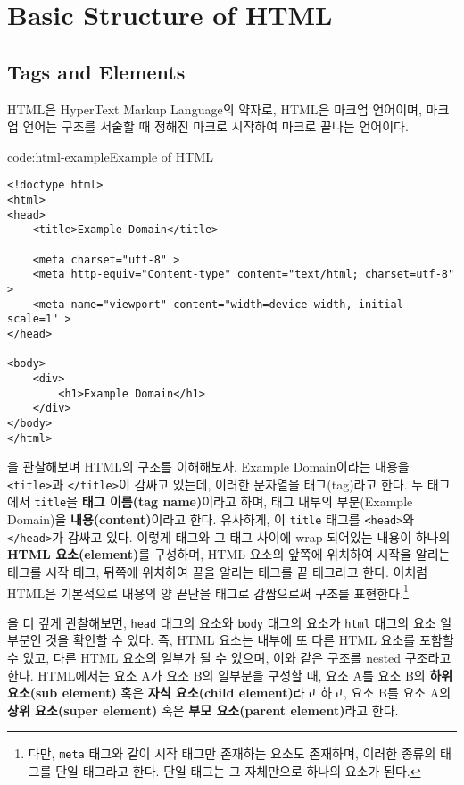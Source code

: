 \section{Basic Structure of HTML} \label{sect:basic-structure-of-html}

\subsection*{Tags and Elements}
HTML은 HyperText Markup Language의 약자로, HTML은 마크업 언어이며, 마크업 언어는 구조를 서술할 때 정해진 마크로 시작하여 마크로 끝나는 언어이다.

\begin{codeenv}{code:html-example}{Example of HTML}\begin{verbatim}
<!doctype html>
<html>
<head>
    <title>Example Domain</title>

    <meta charset="utf-8" >
    <meta http-equiv="Content-type" content="text/html; charset=utf-8" >
    <meta name="viewport" content="width=device-width, initial-scale=1" >
</head>

<body>
    <div>
        <h1>Example Domain</h1>
    </div>
</body>
</html>
\end{verbatim}
\end{codeenv}

을 관찰해보며 HTML의 구조를 이해해보자. Example Domain이라는 내용을 \texttt{<title>}과 \texttt{</title>}이 감싸고 있는데, 이러한 문자열을 태그(tag)라고 한다. 두 태그에서 \texttt{title}을 \textbf{태그 이름(tag name)}이라고 하며, 태그 내부의 부분(Example Domain)을 \textbf{내용(content)}이라고 한다. 유사하게, 이 \texttt{title} 태그를 \texttt{<head>}와 \texttt{</head>}가 감싸고 있다. 이렇게 태그와 그 태그 사이에 wrap 되어있는 내용이 하나의 \textbf{HTML 요소(element)}를 구성하며, HTML 요소의 앞쪽에 위치하여 시작을 알리는 태그를 시작 태그, 뒤쪽에 위치하여 끝을 알리는 태그를 끝 태그라고 한다. 이처럼 HTML은 기본적으로 내용의 양 끝단을 태그로 감쌈으로써 구조를 표현한다.\footnote{다만, \texttt{meta} 태그와 같이 시작 태그만 존재하는 요소도 존재하며, 이러한 종류의 태그를 단일 태그라고 한다. 단일 태그는 그 자체만으로 하나의 요소가 된다.}

을 더 깊게 관찰해보면, \texttt{head} 태그의 요소와 \texttt{body} 태그의 요소가 \texttt{html} 태그의 요소 일부분인 것을 확인할 수 있다. 즉, HTML 요소는 내부에 또 다른 HTML 요소를 포함할 수 있고, 다른 HTML 요소의 일부가 될 수 있으며, 이와 같은 구조를 nested 구조라고 한다. HTML에서는 요소 A가 요소 B의 일부분을 구성할 때, 요소 A를 요소 B의 \textbf{하위 요소(sub element)} 혹은 \textbf{자식 요소(child element)}라고 하고, 요소 B를 요소 A의 \textbf{상위 요소(super element)} 혹은 \textbf{부모 요소(parent element)}라고 한다.

